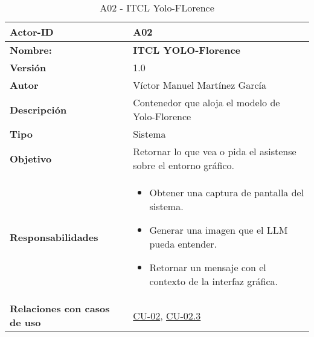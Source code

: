 \begin{table}[H]
	\centering
	\begin{tabularx}{\linewidth}{ p{} p{} }
		\toprule
		\textbf{Actor-ID}    & A02 \\
		\toprule
		\textbf{Nombre: } 			  & \textbf{ITCL YOLO-Florence} \\
		\textbf{Versión}              & 1.0    \\
		\textbf{Autor}                & Víctor Manuel Martínez García \\
		\textbf{Descripción}          & Contenedor que aloja el modelo de Yolo-Florence\\
		\textbf{Tipo}                 & Sistema \\
		\textbf{Objetivo}             & Retornar lo que vea o pida el asistense sobre el entorno gráfico. \\
		\textbf{Responsabilidades}    & 
		\begin{itemize}
			\tightlist
			\item Obtener una captura de pantalla del sistema.
            \item Generar una imagen que el LLM pueda entender.
            \item Retornar un mensaje con el contexto de la interfaz gráfica.
		\end{itemize}\\
		\textbf{Relaciones con casos de uso} & \hyperref[CU-02 Interpretar entorno grafico]{CU-02}, \hyperref[CU-02.3 Obtenener descripcion del entorno visual]{CU-02.3}\\
		\bottomrule
	\end{tabularx}
	\caption{A02 - ITCL Yolo-FLorence}
	\label{actor:ITCL YOLO-Florence}
\end{table}


